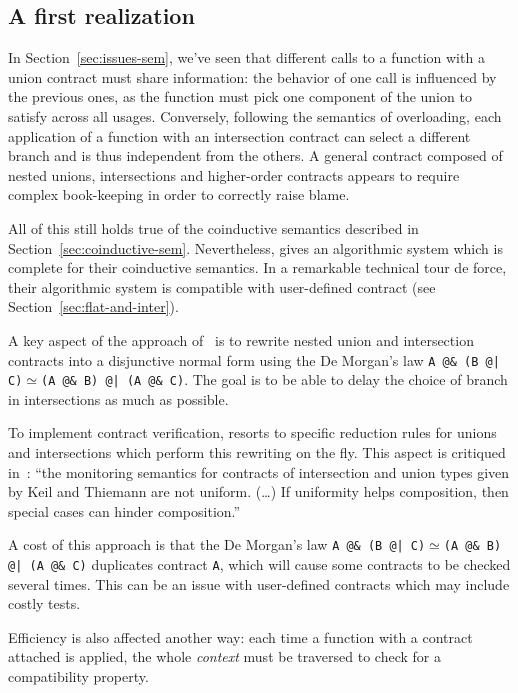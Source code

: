 \documentclass[sigplan,10pt,review,anonymous]{acmart}
\newcommand{\nickel}[1]{\lstinline[language=nickel]{#1}}
\begin{document}
\subsection{A first realization}
\label{sec:keil-thiemann}

In Section~\ref{sec:issues-sem}, we've seen that different calls to a function
with a union contract must share information: the behavior of one call is
influenced by the previous ones, as the function must pick one component of the
union to satisfy across all usages. Conversely, following the semantics of
overloading, each application of a function with an intersection contract can
select a different branch and is thus independent from the others. A general
contract composed of nested unions, intersections and higher-order contracts
appears to require complex book-keeping in order to correctly raise
blame.

All of this still holds true of the coinductive semantics described in
Section~\ref{sec:coinductive-sem}. Nevertheless,
\cite{KeilThiemannUnionIntersection} gives an algorithmic system which
is complete for their coinductive semantics. In a remarkable technical
tour de force, their algorithmic system is compatible with
user-defined contract (see Section~\ref{sec:flat-and-inter}).

A key aspect of the approach of~\cite{KeilThiemannUnionIntersection}
is to rewrite nested union and intersection contracts into a
disjunctive normal form using the De Morgan's law \nickel{A @& (B @|
  C)}$\simeq$\nickel{(A @& B) @| (A @& C)}. The goal is to be able to
delay the choice of branch in intersections as much as possible.

To implement contract verification, \cite{KeilThiemannUnionIntersection} resorts to
specific reduction rules for unions and intersections which perform this
rewriting on the fly. This aspect is critiqued
in~\cite{RootCauseOfBlame}:
``the monitoring semantics for
contracts of intersection and union types given by Keil and Thiemann are not
uniform. (\ldots) If uniformity helps composition, then special cases can hinder
composition.''

A cost of this approach is that the De Morgan's law
\nickel{A @& (B @| C)}$\simeq$\nickel{(A @& B) @| (A @& C)} duplicates
contract \nickel{A}, which will cause some contracts to be checked
several times. This can be an issue with user-defined contracts which
may include costly tests.

Efficiency is also affected another way: each time a function with a
contract attached is applied, the whole \emph{context} must be
traversed to check for a compatibility property.
\end{document}
